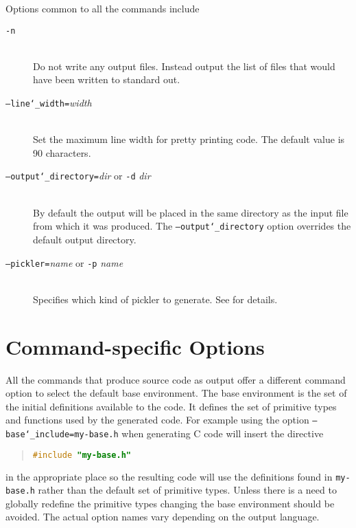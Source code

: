Options common to all the commands include
\begin{description}
  \item[\normalfont\texttt{-n}] \mbox{}\\
      Do not write any output files.
      Instead output the list of files that would have been written to standard out.
  \item[\normalfont\texttt{--line\char`\_width=}\textit{width}] \mbox{}\\
    Set the maximum line width for pretty printing code.
    The default value is 90 characters.
  \item[\normalfont\texttt{--output\char`\_directory=}\textit{dir} or \texttt{-d} \textit{dir}] \mbox{}\\
    By default the output will be placed in the same directory as the
    input file from which it was produced.
    The \texttt{--output\char`\_directory} option overrides the default output directory.
  \item[\normalfont\texttt{--pickler=}\textit{name} or \texttt{-p} \textit{name}] \mbox{}\\
    Specifies which kind of pickler to generate.
    See  for details.
\end{description}%

\section{Command-specific Options}
\label{sec:command-specific-options}

All the commands that produce source code as output offer a different
command option to select the default base environment.
The base environment is the set of the initial definitions available to the code.
It defines the set of primitive types and functions used by the generated code.
For example using the option \texttt{--base\char`\_include=my-base.h}
when generating C code will insert the directive
\begin{quote}\begin{lstlisting}[language=c]
#include "my-base.h"
\end{lstlisting}\end{quote}%
in the appropriate place so the resulting code will use the definitions found in
\texttt{my-base.h} rather than the default set of primitive types.
Unless there is a need to globally redefine
the primitive types changing the base environment should be avoided.
The actual option names vary depending on the output language.


